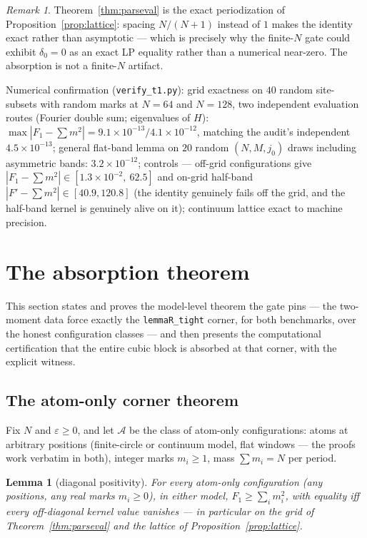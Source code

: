 \documentclass[11pt]{article}
\theoremstyle{plain}
\newtheorem{lemma}[theorem]{Lemma}
\theoremstyle{definition}
\theoremstyle{remark}
\newtheorem*{remk}{Remark}
\begin{document}
\begin{remk}
Theorem~\ref{thm:parseval} is the exact periodization of
Proposition~\ref{prop:lattice}: spacing $N/(N+1)$ instead of $1$ makes the
identity exact rather than asymptotic --- which is precisely why the finite-$N$
gate could exhibit $\delta_0 = 0$ as an exact LP equality rather than a numerical
near-zero. The absorption is not a finite-$N$ artifact.
\end{remk}

Numerical confirmation (\texttt{verify\_t1.py}): grid exactness on $40$ random
site-subsets with random marks at $N = 64$ and $N = 128$, two independent
evaluation routes (Fourier double sum; eigenvalues of $H$):
$\max |F_1 - \sum m^2| = 9.1 \times 10^{-13} / 4.1 \times 10^{-12}$, matching the
audit's independent $4.5 \times 10^{-13}$; general flat-band lemma on $20$ random
$(N, M, j_0)$ draws including asymmetric bands: $3.2 \times 10^{-12}$; controls ---
off-grid configurations give
$|F_1 - \sum m^2| \in [1.3 \times 10^{-2},\ 62.5]$ and on-grid half-band
$|F' - \sum m^2| \in [40.9, 120.8]$ (the identity genuinely fails off the grid,
and the half-band kernel is genuinely alive on it); continuum lattice exact to
machine precision.

\section{The absorption theorem}
\label{sec:absorption}

This section states and proves the model-level theorem the gate pins --- the
two-moment data force exactly the \texttt{lemmaR\_tight} corner, for both
benchmarks, over the honest configuration classes --- and then presents the
computational certification that the entire cubic block is absorbed at that
corner, with the explicit witness.

\subsection{The atom-only corner theorem}
\label{sec:atomonly}

Fix $N$ and $\varepsilon \ge 0$, and let $\mathcal{A}$ be the class of atom-only
configurations: atoms at arbitrary positions (finite-circle or continuum model,
flat windows --- the proofs work verbatim in both), integer marks $m_i \ge 1$,
mass $\sum m_i = N$ per period.

\begin{lemma}[diagonal positivity]
\label{lem:diagpos}
For every atom-only configuration (any positions, any real marks $m_i \ge 0$), in
either model, $F_1 \ge \sum_i m_i^2$, with equality iff every off-diagonal kernel
value vanishes --- in particular on the grid of Theorem~\ref{thm:parseval} and
the lattice of Proposition~\ref{prop:lattice}.
\end{lemma}
\end{document}

